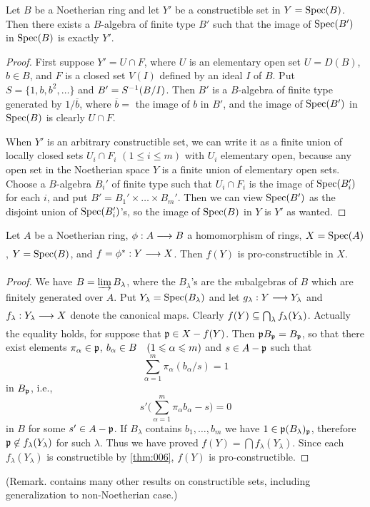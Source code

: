 \documentclass[../main]{subfiles}
\begin{document}
\begin{lemma}\label{lem:06.03}
Let $B$ be a Noetherian ring and let $Y'$ be a constructible set in $Y= \operatorname{Spec}(B)$. Then there exists a $B$-algebra of finite type $B'$ such that the image of $\operatorname{Spec}(B')$ in $\operatorname{Spec}(B)$ is exactly $Y'$.
\end{lemma} 

\begin{proof}
First suppose $Y' = U \cap F$, where $U$ is an elementary open set $U = D(B)$, $b \in B$, and $F$ is a closed set $V(I)$ defined by an ideal $I$ of $B$. Put $S = \{1,b,b^2, \dots\}$ and $B'=S^{-1} (B/I)$. Then $B'$ is a $B$-algebra of finite type generated by $1/\overline{b}$, where $\overline{b} = $ the image of $b$ in $B'$, and the image of $\operatorname{Spec}(B')$ in $\operatorname{Spec}(B)$ is clearly $U \cap F$.

When $Y'$ is an arbitrary constructible set, we can write it as a finite union of locally closed sets $U_i \cap F_i$ $(1 \le i \le m)$ with $U_i$ elementary open, because any open set in the Noetherian space $Y$ is a finite union of elementary open sets. Choose a $B$-algebra $B_i '$ of finite type such that $U_i \cap F_i$ is the image of $\operatorname{Spec}(B_i ')$ for each $i$, and put $B' = B_1 ' \times \dots \times B_m '$. Then we can view $\operatorname{Spec}(B')$ as the disjoint union of $\operatorname{Spec}(B_i ')$'s, so the image of $\operatorname{Spec}(B)$ in $Y$ is $Y'$ as wanted.
\end{proof}

\begin{parproposition}
 \label{pro:6.02} Let $A$ be a Noetherian ring, $\phi : A \varrightarrow{} B$ a homomorphism of rings, $X = \operatorname{Spec}(A)$, $Y=\operatorname{Spec}(B)$, and $f= \SpecInduced{\phi}: Y \varrightarrow{} X$. Then $f(Y)$ is pro-constructible in $X$.
\end{parproposition}

\begin{proof}
We have $B = \varinjlim B_\lambda$, where the $B_\lambda$'s are the subalgebras of $B$ which are finitely generated over $A$. Put $Y_\lambda = \operatorname{Spec}(B_\lambda)$ and let $g_\lambda : Y \varrightarrow{} Y_\lambda$ and $f_\lambda : Y_\lambda \varrightarrow{} X$ denote the canonical maps. Clearly $f(Y) \subseteq \bigcap_\lambda f_\lambda (Y_\lambda)$. Actually the equality holds, for suppose that $\mathfrak{p} \in X - f(Y)$. Then $\mathfrak{p} B_{\mathfrak{p}} = B_{\mathfrak{p}}$, so that there exist elements $\pi_\alpha \in \mathfrak{p}$, $b_\alpha \in B\for{1\leqslant \alpha \leqslant m}$ and $s \in A - \mathfrak{p}$ such that 
\[
\sum_{\alpha = 1} ^m \pi_\alpha (b_\alpha / s) = 1
\]
in $B_{\mathfrak{p}}$, i.e.,
\[
s'\bigg(\sum_{\alpha = 1} ^m \pi_\alpha b_\alpha - s\bigg) = 0
\]
in $B$ for some $s' \in A - \mathfrak{p}$. If $B_\lambda$ contains $b_1, \ldots, b_m$ we have $1 \in \mathfrak{p} (B_\lambda)_{\mathfrak{p}}$, therefore $\mathfrak{p} \not\in f_\lambda (Y_\lambda)$ for such $\lambda$. Thus we have proved $f(Y) = \bigcap f_\lambda (Y_\lambda)$. Since each $f_\lambda (Y_\lambda)$ is constructible by \ref{thm:006}, $f(Y)$ is pro-constructible.
\end{proof}
(Remark. \cite{egaIV} contains many other results on constructible sets, including generalization to non-Noetherian case.) %
\end{document}
